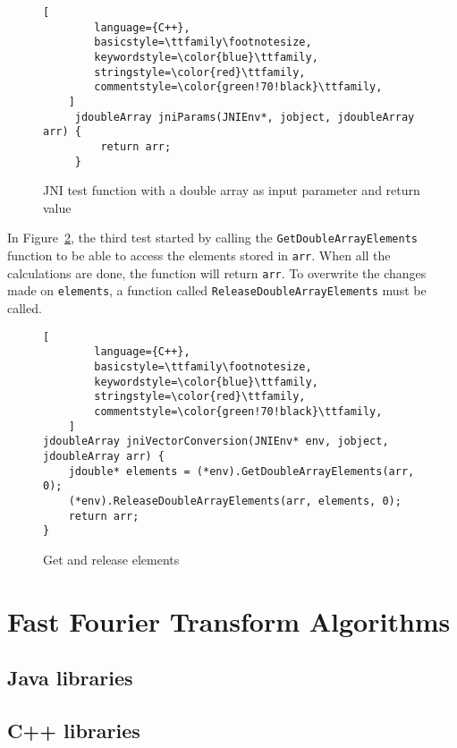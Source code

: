 \begin{figure}
\begin{lstlisting}[
        language={C++},
        basicstyle=\ttfamily\footnotesize,
        keywordstyle=\color{blue}\ttfamily,
        stringstyle=\color{red}\ttfamily,
        commentstyle=\color{green!70!black}\ttfamily,
    ]
     jdoubleArray jniParams(JNIEnv*, jobject, jdoubleArray arr) {
         return arr;
     }
\end{lstlisting}
\caption{JNI test function with a double array as input parameter and return value}
\label{fig:jni:params}
\end{figure}

In Figure~\ref{fig:jni:conversion}, the third test started by calling the \texttt{GetDoubleArrayElements} function to be able to access the elements stored in \texttt{arr}. When all the calculations are done, the function will return \texttt{arr}. To overwrite the changes made on \texttt{elements}, a function called \texttt{ReleaseDoubleArrayElements} must be called.

\begin{figure}
\begin{lstlisting}[
        language={C++},
        basicstyle=\ttfamily\footnotesize,
        keywordstyle=\color{blue}\ttfamily,
        stringstyle=\color{red}\ttfamily,
        commentstyle=\color{green!70!black}\ttfamily,
    ]
jdoubleArray jniVectorConversion(JNIEnv* env, jobject, jdoubleArray arr) {
    jdouble* elements = (*env).GetDoubleArrayElements(arr, 0);
    (*env).ReleaseDoubleArrayElements(arr, elements, 0);
    return arr;
}
\end{lstlisting}
\caption{Get and release elements}
\label{fig:jni:conversion}
\end{figure}

\section{Fast Fourier Transform Algorithms}

\subsection{Java libraries}

\subsection{C++ libraries}

